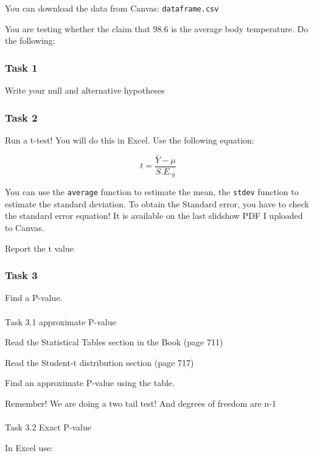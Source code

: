 \documentclass[
  letterpaper,
  DIV=11,
  numbers=noendperiod]{scrartcl}
\makeatletter
\let\oldparagraph\paragraph
\renewcommand{\paragraph}{
    \@ifstar
      \xxxParagraphStar
      \xxxParagraphNoStar
  }
\newcommand{\xxxParagraphStar}[1]{\oldparagraph*{#1}\mbox{}}
\newcommand{\xxxParagraphNoStar}[1]{\oldparagraph{#1}\mbox{}}
\makeatother
\begin{document}
You can download the data from Canvas: \texttt{dataframe.csv}

You are testing whether the claim that 98.6 is the average body
temperature. Do the following:

\subsubsection{Task 1}\label{task-1}

Write your null and alternative hypotheses

\subsubsection{Task 2}\label{task-2}

Run a t-test! You will do this in Excel. Use the following equation:

\[
t = \frac{ \bar{Y} - \mu}{S.E._\bar{y}} 
\]

You can use the \texttt{average} function to estimate the mean, the
\texttt{stdev} function to estimate the standard deviation. To obtain
the Standard error, you have to check the standard error equation! It is
available on the last slidshow PDF I uploaded to Canvas.

Report the t value

\subsubsection{Task 3}\label{task-3}

Find a P-value.

\paragraph{Task 3.1 approximate
P-value}\label{task-3.1-approximate-p-value}

Read the Statistical Tables section in the Book (page 711)

Read the Student-t distribution section (page 717)

Find an approximate P-value using the table.

Remember! We are doing a two tail test! And degrees of freedom are n-1

\paragraph{Task 3.2 Exact P-value}\label{task-3.2-exact-p-value}

In Excel use:
\end{document}
